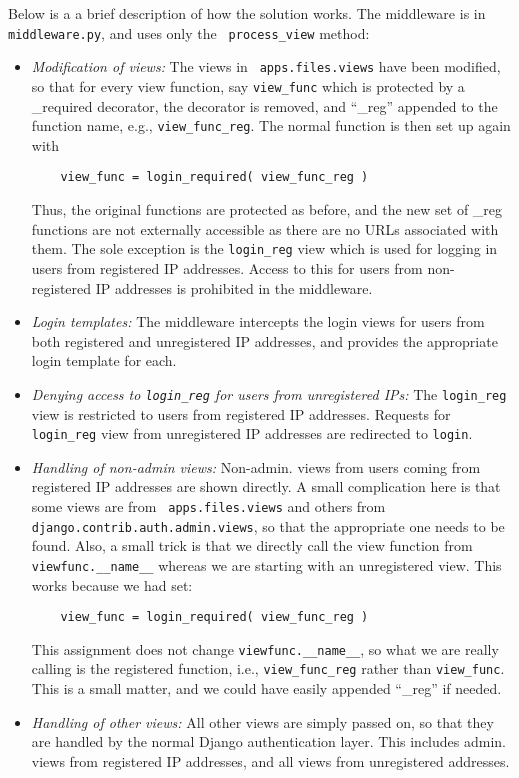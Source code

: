 \label{sec:technical}
Below is a a brief description of how the solution works. The
middleware is in {\tt middleware.py}, and uses only the {\tt
  process\_view} method:
\begin{itemize}
\item \emph{Modification of views: } The views in {\tt
    apps.files.views} have been modified, so that for every view
  function, say {\tt view\_func} which is protected by a
  \@login\_required decorator, the decorator is removed, and ``\_reg''
  appended to the function name, e.g., {\tt view\_func\_reg}. The
  normal function is then set up again with
  \begin{Verbatim}
    view_func = login_required( view_func_reg )
  \end{Verbatim}
  Thus, the original functions are protected as before, and the
  new set of \*\_reg functions are not externally accessible as
  there are no URLs associated with them. The sole exception is
  the {\tt login\_reg} view which is used for logging in users from
  registered IP addresses. Access to this for users from
  non-registered IP addresses is prohibited in the middleware. 
\item \emph{Login templates: } The middleware intercepts the
  login views for users from both registered and unregistered IP
  addresses, and provides the appropriate login template for
  each.
\item \emph{Denying access to {\tt login\_reg} for users from
    unregistered IPs: } The {\tt login\_reg} view is restricted to users
  from registered IP addresses. Requests for {\tt login\_reg}
  view from unregistered IP addresses are redirected to {\tt login}.
\item \emph{Handling of non-admin views: } Non-admin. views from
  users coming from registered IP addresses are shown directly. A
  small complication here is that some views are from {\tt
    apps.files.views} and others from {\tt
    django.contrib.auth.admin.views}, so that the appropriate one
  needs to be found. Also, a small trick is that we directly call
  the view function from {\tt viewfunc.\_\_name\_\_} whereas we
  are starting with an unregistered view. This works because we
  had set:
  \begin{Verbatim}
    view_func = login_required( view_func_reg )
  \end{Verbatim}
  This assignment does not change {\tt viewfunc.\_\_name\_\_}, so
  what we are really calling is the registered function, i.e.,
  {\tt view\_func\_reg} rather than {\tt view\_func}. This is a
  small matter, and we could have easily appended ``\_reg'' if
  needed.
\item \emph{Handling of other views: } All other views are simply
  passed on, so that they are handled by the normal Django
  authentication layer. This includes admin. views from registered
  IP addresses, and all views from unregistered addresses.
\end{itemize}
